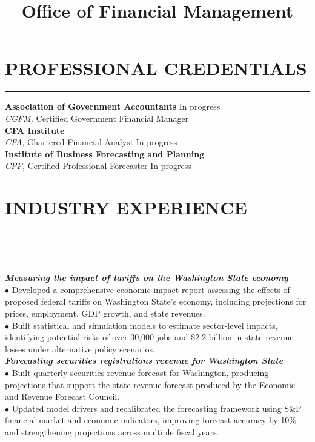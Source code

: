 \documentclass[overlapped]{res}
\begin{document}
\begin{resume}
\section{PROFESSIONAL CREDENTIALS}
\vspace{-3 mm}
\noindent\rule{\textwidth}{1pt}
\textbf{Association of Government Accountants} \hfill In progress\\
{\sl CGFM,} Certified Government Financial Manager \hfill\\
[2mm]
\textbf{CFA Institute} \\
{\sl CFA,} Chartered Financial Analyst  \hfill In progress\\
[2 mm]
\textbf{Institute of Business Forecasting and Planning} \\
{\sl CPF,} Certified Professional Forecaster  \hfill In progress
\vspace{-5 mm}
\vspace{0 mm}
\section{INDUSTRY EXPERIENCE}
\vspace{-3 mm}
\noindent\rule{\textwidth}{1pt}\\[-8 mm]
\title{\textbf{Office of Financial Management}}
\begin{position}\\[- 2 mm]
\textbf{\textit{Measuring the impact of tariffs on the Washington State economy}}\\
$\bullet$ Developed a comprehensive economic impact report assessing the effects of proposed federal tariffs on Washington State’s economy, including projections for prices, employment, GDP growth, and state revenues.\\
$\bullet$ Built statistical and simulation models to estimate sector-level impacts, identifying potential risks of over 30,000 jobs and \$2.2 billion in state revenue losses under alternative policy scenarios.\\[-6.5 mm]

\textbf{\textit{Forecasting securities registrations revenue for Washington State }}\\
$\bullet$ Built quarterly securities revenue forecast for Washington, producing projections that support the state revenue forecast produced by the Economic and Revenue Forecast Council.\\
$\bullet$ Updated model drivers and recalibrated the forecasting framework using S\&P financial market and economic indicators, improving forecast accuracy by 10\% and strengthening projections across multiple fiscal years.\\
\end{position}\\[-8.5 mm]


\end{resume}
\end{document}
